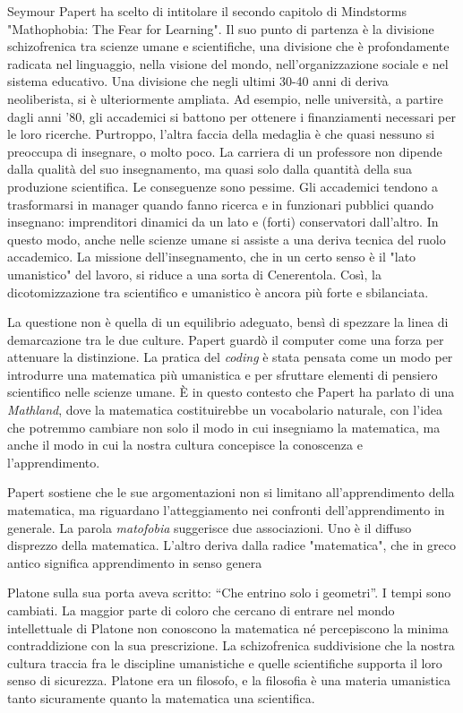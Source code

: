 Seymour Papert ha scelto di intitolare il secondo capitolo di Mindstorms "Mathophobia: The Fear for Learning". Il suo punto di partenza è la divisione schizofrenica tra scienze umane e scientifiche, una divisione che è profondamente radicata nel linguaggio, nella visione del mondo, nell'organizzazione sociale e nel sistema educativo. Una divisione che negli ultimi 30-40 anni di deriva neoliberista, si è ulteriormente ampliata. Ad esempio, nelle università, a partire dagli anni '80, gli accademici si battono per ottenere i finanziamenti necessari per le loro ricerche. Purtroppo, l'altra faccia della medaglia è che quasi nessuno si preoccupa di insegnare, o molto poco. La carriera di un professore non dipende dalla qualità del suo insegnamento, ma quasi solo dalla quantità della sua produzione scientifica. Le conseguenze sono pessime. Gli accademici tendono a trasformarsi in manager quando fanno ricerca e in funzionari pubblici quando insegnano: imprenditori dinamici da un lato e (forti) conservatori dall'altro. In questo modo, anche nelle scienze umane si assiste a una deriva tecnica del ruolo accademico. La missione dell'insegnamento, che in un certo senso è il "lato umanistico" del lavoro, si riduce a una sorta di Cenerentola. Così, la dicotomizzazione tra scientifico e umanistico è ancora più forte e sbilanciata.

La questione non è quella di un equilibrio adeguato, bensì di spezzare la linea di demarcazione tra le due culture. Papert guardò il computer come una forza per attenuare la distinzione. La pratica del \textit{coding} è stata pensata come un modo per introdurre una matematica più umanistica e per sfruttare elementi di pensiero scientifico nelle scienze umane. È in questo contesto che Papert ha parlato di una \textit{Mathland}, dove la matematica costituirebbe un vocabolario naturale, con l'idea che potremmo cambiare non solo il modo in cui insegniamo la matematica, ma anche il modo in cui la nostra cultura concepisce la conoscenza e l'apprendimento.

Papert sostiene che le sue argomentazioni non si limitano all'apprendimento della matematica, ma riguardano l'atteggiamento nei confronti dell'apprendimento in generale. La parola \textit{matofobia} suggerisce due associazioni. Uno è il diffuso disprezzo della matematica. L'altro deriva dalla radice "matematica", che in greco antico significa apprendimento in senso genera


Platone sulla sua porta aveva scritto: “Che entrino solo i geometri”. I tempi sono cambiati. La maggior parte di coloro che cercano di entrare nel mondo intellettuale di Platone non conoscono la matematica né percepiscono la minima contraddizione con la sua prescrizione. La schizofrenica suddivisione che la nostra cultura traccia fra le discipline umanistiche e quelle scientifiche supporta il loro senso di sicurezza. Platone era un filosofo, e la filosofia è una materia umanistica tanto sicuramente quanto la matematica una scientifica.

